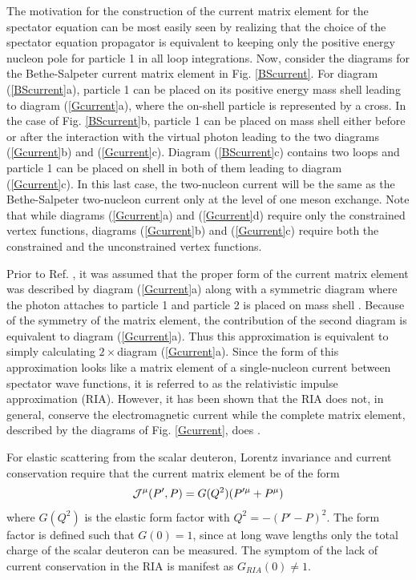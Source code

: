 \documentclass[mythesis.tex]{subfiles}
\begin{document}
The motivation for the construction of the current matrix element for the
spectator equation can be most easily seen by realizing that the choice of
the spectator equation propagator is equivalent to keeping only the
positive energy nucleon pole for particle 1 in all loop integrations. Now,
consider the diagrams for the Bethe-Salpeter current matrix element in
Fig. \ref{BScurrent}. For diagram (\ref{BScurrent}a), particle 1 can be
placed on its positive energy mass shell leading to diagram
(\ref{Gcurrent}a), where the on-shell particle is represented by a cross.
In the case of Fig. \ref{BScurrent}b, particle 1
can be placed on mass shell either before or after the interaction with
the virtual photon leading to the two diagrams (\ref{Gcurrent}b) and
(\ref{Gcurrent}c). Diagram (\ref{BScurrent}c) contains two loops and
particle 1 can be placed on shell in both of them leading to diagram
(\ref{Gcurrent}c). In this last case, the two-nucleon current will be
the same as the Bethe-Salpeter two-nucleon current only at the level of
one meson exchange. Note that while diagrams (\ref{Gcurrent}a) and
(\ref{Gcurrent}d) require only the constrained vertex functions, diagrams
(\ref{Gcurrent}b) and (\ref{Gcurrent}c) require both the constrained and
the unconstrained vertex functions.

Prior to Ref. \cite{GrossandRiska}, it was assumed that the proper form of the current
matrix element was described by diagram (\ref{Gcurrent}a) along with
a symmetric diagram where the photon attaches to particle 1 and particle 2
is placed on mass shell \cite{ACG}. Because of the symmetry of the matrix element, the
contribution of the second diagram is equivalent to
diagram (\ref{Gcurrent}a). Thus this approximation is equivalent to simply
calculating $2\times$diagram (\ref{Gcurrent}a). Since the form of this
approximation looks like a matrix element of a single-nucleon current
between spectator wave functions, it is referred to as the relativistic
impulse approximation (RIA). However, it has been shown that the RIA
does not, in general, conserve the electromagnetic current while the complete
matrix element, described by the diagrams of Fig. \ref{Gcurrent}, does
\cite{GrossandRiska}.

For elastic scattering from the scalar deuteron, Lorentz invariance and
current conservation require that the current matrix element be of the
form
%
\begin{equation}
{\cal J}^\mu(P',P)=G(Q^2)(P'^\mu+P^\mu)
\end{equation}
%
where $G(Q^2)$ is the elastic form factor with $Q^2=-(P'-P)^2$. The form
factor is defined such that $G(0)=1$, since at long wave lengths only the
total charge of the scalar deuteron can be measured. The symptom of the
lack of current conservation in the RIA is manifest as $G_{RIA}(0)\neq 1$.
\end{document}

